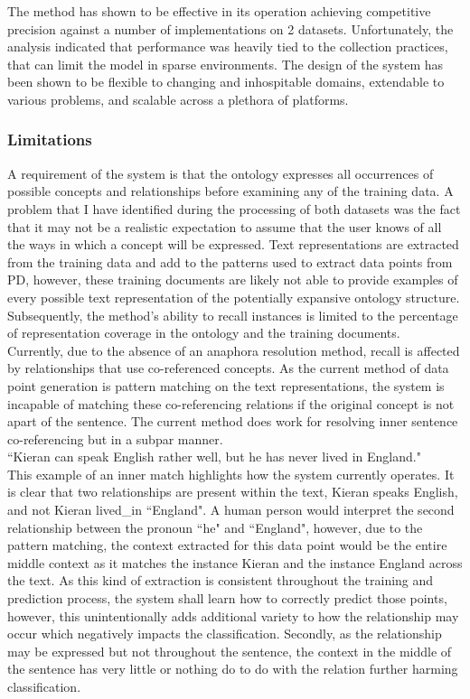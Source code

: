 \documentclass[12pt]{article} %
\begin{document}
The method has shown to be effective in its operation achieving competitive precision against a number of implementations on 2 datasets. Unfortunately, the analysis indicated that performance was heavily tied to the collection practices, that can limit the model in sparse environments. The design of the system has been shown to be flexible to changing and inhospitable domains, extendable to various problems, and scalable across a plethora of platforms.


\subsubsection{Limitations}

A requirement of the system is that the ontology expresses all occurrences of possible concepts and relationships before examining any of the training data. A problem that I have identified during the processing of both datasets was the fact that it may not be a realistic expectation to assume that the user knows of all the ways in which a concept will be expressed. Text representations are extracted from the training data and add to the patterns used to extract data points from PD, however, these training documents are likely not able to provide examples of every possible text representation of the potentially expansive ontology structure. Subsequently, the method’s ability to recall instances is limited to the percentage of representation coverage in the ontology and the training documents.\\

Currently, due to the absence of an anaphora resolution method, recall is affected by relationships that use co-referenced concepts. As the current method of data point generation is pattern matching on the text representations, the system is incapable of matching these co-referencing relations if the original concept is not apart of the sentence. The current method does work for resolving inner sentence co-referencing but in a subpar manner.\\

``Kieran can speak English rather well, but he has never lived in England."\\

This example of an inner match highlights how the system currently operates. It is clear that two relationships are present within the text, Kieran speaks English, and not Kieran lived\_in ``England". A human person would interpret the second relationship between the pronoun ``he" and ``England", however, due to the pattern matching, the context extracted for this data point would be the entire middle context as it matches the instance Kieran and the instance England across the text. As this kind of extraction is consistent throughout the training and prediction process, the system shall learn how to correctly predict those points, however, this unintentionally adds additional variety to how the relationship may occur which negatively impacts the classification. Secondly, as the relationship may be expressed but not throughout the sentence, the context in the middle of the sentence has very little or nothing do to do with the relation further harming classification.\\
\end{document}
